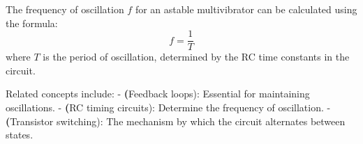 The frequency of oscillation \( f \) for an astable multivibrator can be calculated using the formula:
\[
f = \frac{1}{T}
\]
where \( T \) is the period of oscillation, determined by the RC time constants in the circuit.

Related concepts include:
- \textbf(Feedback loops): Essential for maintaining oscillations.
- \textbf(RC timing circuits): Determine the frequency of oscillation.
- \textbf(Transistor switching): The mechanism by which the circuit alternates between states.

